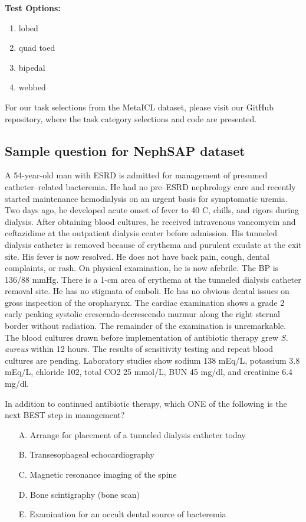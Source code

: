 \documentclass{article}
\begin{document}
\textbf{Test Options:}
\begin{enumerate}
    \item lobed
    \item quad toed
    \item bipedal
    \item webbed
\end{enumerate}

For our task selections from the MetaICL dataset, please visit our GitHub repository, where the task category selections and code are presented.

\subsection{Sample question for NephSAP dataset}

A 54-year-old man with ESRD is admitted for management of presumed catheter–related bacteremia. He had no pre–ESRD nephrology care and recently started maintenance hemodialysis on an urgent basis for symptomatic uremia. Two days ago, he developed acute onset of fever to 40 C, chills, and rigors during dialysis. After obtaining blood cultures, he received intravenous vancomycin and ceftazidime at the outpatient dialysis center before admission. His tunneled dialysis catheter is removed because of erythema and purulent exudate at the exit site. His fever is now resolved. He does not have back pain, cough, dental complaints, or rash. On physical examination, he is now afebrile. The BP is 136/88 mmHg. There is a 1-cm area of erythema at the tunneled dialysis catheter removal site. He has no stigmata of emboli. He has no obvious dental issues on gross inspection of the oropharynx. The cardiac examination shows a grade 2 early peaking systolic crescendo-decrescendo murmur along the right sternal border without radiation. The remainder of the examination is unremarkable. The blood cultures drawn before implementation of antibiotic therapy grew \textit{S. aureus} within 12 hours. The results of sensitivity testing and repeat blood cultures are pending. Laboratory studies show sodium 138 mEq/L, potassium 3.8 mEq/L, chloride 102, total CO2 25 mmol/L, BUN 45 mg/dl, and creatinine 6.4 mg/dl.

In addition to continued antibiotic therapy, which ONE of the following is the next BEST step in management?

\begin{itemize}
    \item[A.] Arrange for placement of a tunneled dialysis catheter today
    \item[B.] Transesophageal echocardiography
    \item[C.] Magnetic resonance imaging of the spine
    \item[D.] Bone scintigraphy (bone scan)
    \item[E.] Examination for an occult dental source of bacteremia
\end{itemize}
\end{document}
